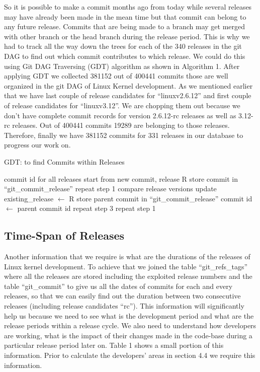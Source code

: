 \documentclass{acm_proc_article-sp}
\begin{document}
So it is possible to make a commit months ago from today while several releases may have already been made in the mean time but that commit can belong to any future release. Commits that are being made to a branch may get merged with other branch or the head branch during the release period. This is why we had to track all the way down the trees for each of the 340 releases in the git DAG to find out which commit contributes to which release. We could do this using Git DAG Traversing (GDT) algorithm as shown in Algorithm 1. After applying GDT we collected 381152 out of 400441 commits those are well organized in the git DAG of Linux Kernel development. As we mentioned earlier that we have last couple of release candidates for ``linuxv2.6.12'' and first couple of release candidates for ``linuxv3.12''. We are chopping them out because we don't have complete commit records for version 2.6.12-rc releases as well as 3.12-rc releases. Out of 400441 commits 19289 are belonging to those releases. Therefore, finally we have 381152 commits for 331 releases in our database to progress our work on.
\begin{algorithm}
\caption{GDT: to find Commits within Releases}
\begin{algorithmic}[1]
\REQUIRE
\STATE commit id for all releases
\ENSURE
{}
\STATE start from new commit, release R
\STATE store commit in ``git\_commit\_release''
			\STATE repeat step 1
			\STATE compare release versions
				\STATE update existing\_release $\gets$ R
			\ENDIF
		\ELSE
			\STATE store parent commit in ``git\_commit\_release''
			\STATE commit id $\gets$ parent commit id
			\STATE repeat step 3
		\ENDIF
	\ENDFOR
{}
	\STATE repeat step 1
\ENDIF
\ENDFOR
\end{algorithmic}
\end{algorithm}
\subsection{Time-Span of Releases}
Another information that we require is what are the durations of the releases of Linux kernel development. To achieve that we joined the table ``git\_refs\_tags'' where all the releases are stored including the exploited release numbers and the table ``git\_commit'' to give us all the dates of commits for each and every releases, so that we can easily find out the duration between two consecutive releases (including release candidates ``rc''). This information will significantly help us because we need to see what is the development period and what are the release periods within a release cycle. We also need to understand how developers are working, what is the impact of their changes made in the code-base during a particular release period later on. Table 1 shows a small portion of this information. Prior to calculate the developers' areas in section 4.4 we require this information.
\end{document}
